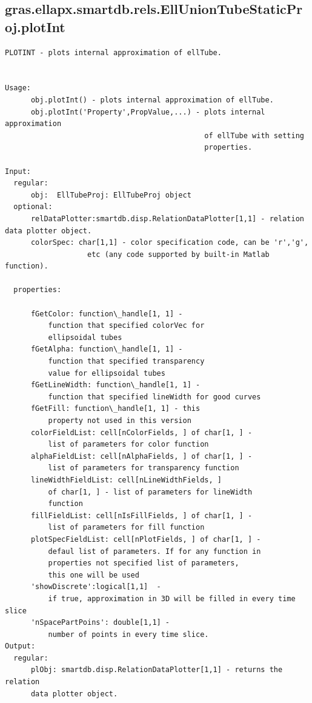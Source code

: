 \documentclass[letterpaper,10pt,english]{sphinxmanual}
\begin{document}
\subsection{gras.ellapx.smartdb.rels.EllUnionTubeStaticProj.plotInt}
\label{chap_functions:gras-ellapx-smartdb-rels-elluniontubestaticproj-plotint}
\begin{Verbatim}[commandchars=\\\{\}]
PLOTINT - plots internal approximation of ellTube.


Usage:
      obj.plotInt() - plots internal approximation of ellTube.
      obj.plotInt('Property',PropValue,...) - plots internal approximation
                                              of ellTube with setting
                                              properties.

Input:
  regular:
      obj:  EllTubeProj: EllTubeProj object
  optional:
      relDataPlotter:smartdb.disp.RelationDataPlotter[1,1] - relation data plotter object.
      colorSpec: char[1,1] - color specification code, can be 'r','g',
                   etc (any code supported by built-in Matlab function).

  properties:

      fGetColor: function\_handle[1, 1] -
          function that specified colorVec for
          ellipsoidal tubes
      fGetAlpha: function\_handle[1, 1] -
          function that specified transparency
          value for ellipsoidal tubes
      fGetLineWidth: function\_handle[1, 1] -
          function that specified lineWidth for good curves
      fGetFill: function\_handle[1, 1] - this
          property not used in this version
      colorFieldList: cell[nColorFields, ] of char[1, ] -
          list of parameters for color function
      alphaFieldList: cell[nAlphaFields, ] of char[1, ] -
          list of parameters for transparency function
      lineWidthFieldList: cell[nLineWidthFields, ]
          of char[1, ] - list of parameters for lineWidth
          function
      fillFieldList: cell[nIsFillFields, ] of char[1, ] -
          list of parameters for fill function
      plotSpecFieldList: cell[nPlotFields, ] of char[1, ] -
          defaul list of parameters. If for any function in
          properties not specified list of parameters,
          this one will be used
      'showDiscrete':logical[1,1]  -
          if true, approximation in 3D will be filled in every time slice
      'nSpacePartPoins': double[1,1] -
          number of points in every time slice.
Output:
  regular:
      plObj: smartdb.disp.RelationDataPlotter[1,1] - returns the relation
      data plotter object.
\end{Verbatim}
\end{document}
